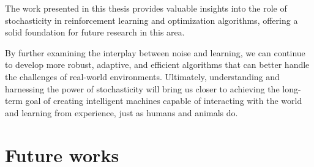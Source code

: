 The work presented in this thesis provides valuable insights into the role of stochasticity in reinforcement learning and optimization algorithms, offering a solid foundation for future research in this area.

By further examining the interplay between noise and learning, we can continue to develop more robust, adaptive, and efficient algorithms that can better handle the challenges of real-world environments. Ultimately, understanding and harnessing the power of stochasticity will bring us closer to achieving the long-term goal of creating intelligent machines capable of interacting with the world and learning from experience, just as humans and animals do.



\section*{Future works}

 
 






